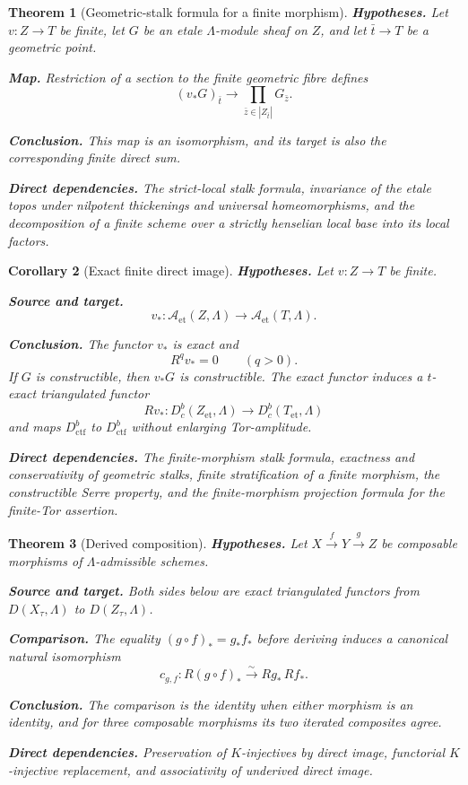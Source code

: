 \documentclass[10pt]{article}
\newtheorem{theorem}{Theorem}[section]
\newtheorem{corollary}[theorem]{Corollary}
\theoremstyle{definition}
\newcommand{\Dbc}{D^b_c}
\newcommand{\Dctf}{D^b_{\mathrm{ctf}}}
\newcommand{\deps}[1]{\par\smallskip\noindent\textbf{Direct dependencies.} #1}
\begin{document}
\begin{theorem}[Geometric-stalk formula for a finite morphism]
\label{thm:finite-stalk}
\textbf{Hypotheses.} Let $v:Z\to T$ be finite, let $G$ be an etale
$\Lambda$-module sheaf on $Z$, and let $\bar t\to T$ be a geometric point.

\textbf{Map.} Restriction of a section to the finite geometric fibre defines
\[
 (v_*G)_{\bar t}\longrightarrow
 \prod_{\bar z\in |Z_{\bar t}|}G_{\bar z}.
\]

\textbf{Conclusion.} This map is an isomorphism, and its target is also the
corresponding finite direct sum.
\deps{The strict-local stalk formula, invariance of the etale topos under
nilpotent thickenings and universal homeomorphisms, and the decomposition of
a finite scheme over a strictly henselian local base into its local factors.}
\end{theorem}

\begin{corollary}[Exact finite direct image]
\label{cor:finite-exact}
\textbf{Hypotheses.} Let $v:Z\to T$ be finite.

\textbf{Source and target.}
\[
 v_*:\mathcal A_{\mathrm{et}}(Z,\Lambda)\longrightarrow
      \mathcal A_{\mathrm{et}}(T,\Lambda).
\]

\textbf{Conclusion.} The functor $v_*$ is exact and
\[
 R^qv_*=0\qquad(q>0).
\]
If $G$ is constructible, then $v_*G$ is constructible.  The exact functor
induces a $t$-exact triangulated functor
\[
 Rv_*:\Dbc(Z_{\mathrm{et}},\Lambda)\longrightarrow
       \Dbc(T_{\mathrm{et}},\Lambda)
\]
and maps $\Dctf$ to $\Dctf$ without enlarging
Tor-amplitude.
\deps{The finite-morphism stalk formula, exactness and conservativity of
geometric stalks, finite stratification of a finite morphism, the
constructible Serre property, and the finite-morphism projection formula for
the finite-Tor assertion.}
\end{corollary}

\begin{theorem}[Derived composition]
\label{thm:composition}
\textbf{Hypotheses.} Let $X\xrightarrow{f}Y\xrightarrow{g}Z$ be composable
morphisms of $\Lambda$-admissible schemes.

\textbf{Source and target.} Both sides below are exact triangulated functors
from $D(X_\tau,\Lambda)$ to $D(Z_\tau,\Lambda)$.

\textbf{Comparison.} The equality $(g\circ f)_*=g_*f_*$ before deriving
induces a canonical natural isomorphism
\[
 c_{g,f}:R(g\circ f)_*\xrightarrow{\ \sim\ }Rg_*\,Rf_*.
\]

\textbf{Conclusion.} The comparison is the identity when either morphism is
an identity, and for three composable morphisms its two iterated composites
agree.
\deps{Preservation of $K$-injectives by direct image, functorial
$K$-injective replacement, and associativity of underived direct image.}
\end{theorem}
\end{document}
